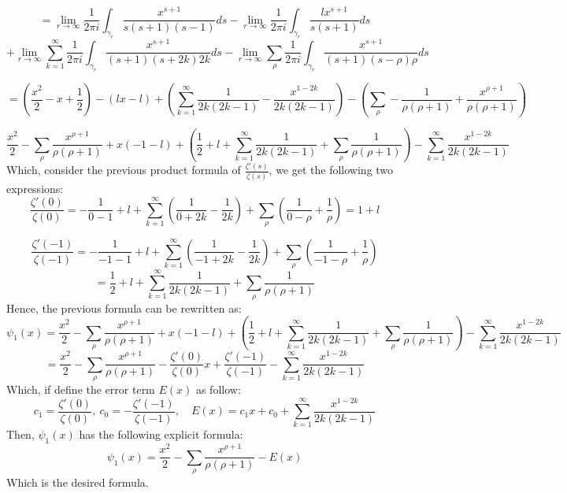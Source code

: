\documentclass{article}
\begin{document}
\hfil

$$ = \lim_{r\rightarrow\infty}\frac{1}{2\pi i}\int_{\gamma_{r}}\frac{x^{s+1}}{s(s+1)(s-1)}ds-\lim_{r\rightarrow\infty}\frac{1}{2\pi i}\int_{\gamma_{r}}\frac{lx^{s+1}}{s(s+1)}ds$$
$$+ \lim_{r\rightarrow\infty}\sum_{k=1}^{\infty}\frac{1}{2\pi i}\int_{\gamma_{r}}\frac{x^{s+1}}{(s+1)(s+2k)2k}ds - \lim_{r\rightarrow\infty}\sum_{\rho}\frac{1}{2\pi i}\int_{\gamma_{r}}\frac{x^{s+1}}{(s+1)(s-\rho)\rho}ds$$

\hfil

$$ = \left(\frac{x^2}{2}-x+\frac{1}{2}\right) - \left(lx-l\right)+\left(\sum_{k=1}^{\infty}\frac{1}{2k(2k-1)}-\frac{x^{1-2k}}{2k(2k-1)}\right) - \left(\sum_{\rho}-\frac{1}{\rho(\rho+1)}+\frac{x^{\rho+1}}{\rho(\rho+1)}\right)$$

\hfil

$$\frac{x^2}{2} - \sum_{\rho}\frac{x^{\rho+1}}{\rho(\rho+1)} + x\left(-1-l\right) + \left(\frac{1}{2}+l+\sum_{k=1}^{\infty}\frac{1}{2k(2k-1)}+\sum_{\rho}\frac{1}{\rho(\rho+1)}\right)-\sum_{k=1}^{\infty}\frac{x^{1-2k}}{2k(2k-1)}$$
Which, consider the previous product formula of $\frac{\zeta'(s)}{\zeta(s)}$, we get the following two expressions:
$$\frac{\zeta'(0)}{\zeta(0)} = -\frac{1}{0-1}+l+\sum_{k=1}^{\infty}\left(\frac{1}{0+2k}-\frac{1}{2k}\right) + \sum_{\rho}\left(\frac{1}{0-\rho}+\frac{1}{\rho}\right) = 1+l$$

$$\frac{\zeta'(-1)}{\zeta(-1)}=-\frac{1}{-1-1}+l+\sum_{k=1}^{\infty}\left(\frac{1}{-1+2k}-\frac{1}{2k}\right) + \sum_{\rho}\left(\frac{1}{-1-\rho}+\frac{1}{\rho}\right)$$
$$ = \frac{1}{2}+l + \sum_{k=1}^{\infty}\frac{1}{2k(2k-1)}+\sum_{\rho}\frac{1}{\rho(\rho+1)}$$
Hence, the previous formula can be rewritten as:
$$\psi_1(x)= \frac{x^2}{2} - \sum_{\rho}\frac{x^{\rho+1}}{\rho(\rho+1)} + x\left(-1-l\right) + \left(\frac{1}{2}+l+\sum_{k=1}^{\infty}\frac{1}{2k(2k-1)}+\sum_{\rho}\frac{1}{\rho(\rho+1)}\right)-\sum_{k=1}^{\infty}\frac{x^{1-2k}}{2k(2k-1)}$$
$$ = \frac{x^2}{2}-\sum_{\rho}\frac{x^{\rho+1}}{\rho(\rho+1)} - \frac{\zeta'(0)}{\zeta(0)}x + \frac{\zeta'(-1)}{\zeta(-1)} - \sum_{k=1}^{\infty}\frac{x^{1-2k}}{2k(2k-1)}$$
Which, if define the error term $E(x)$ as follow:
$$c_1=\frac{\zeta'(0)}{\zeta(0)},\ c_0=-\frac{\zeta'(-1)}{\zeta(-1)},\quad E(x)=c_1x+c_0+\sum_{k=1}^{\infty}\frac{x^{1-2k}}{2k(2k-1)}$$
Then, $\psi_1(x)$ has the following explicit formula:
$$\psi_1(x) = \frac{x^2}{2} - \sum_{\rho}\frac{x^{\rho+1}}{\rho(\rho+1)}-E(x)$$
Which is the desired formula.


\break
\end{document}
